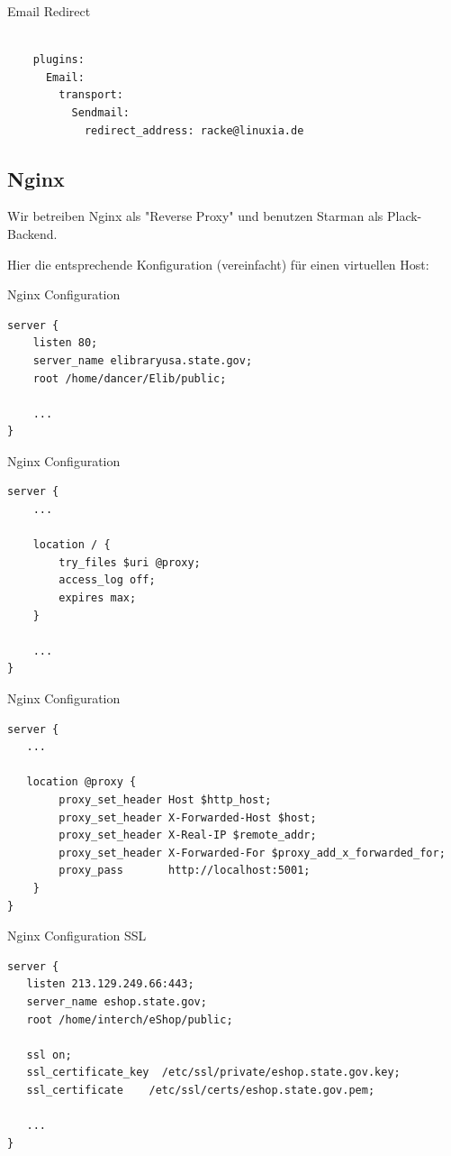 \begin{frame}[fragile]{Email Redirect}
\begin{lstlisting}

    plugins:
      Email:
        transport:
          Sendmail:
            redirect_address: racke@linuxia.de

\end{lstlisting}
\end{frame}

\subsection{Nginx}
    
Wir betreiben Nginx als "Reverse Proxy" und benutzen Starman als
Plack-Backend.

Hier die entsprechende Konfiguration (vereinfacht) für einen virtuellen
Host:

\begin{frame}[fragile]{Nginx Configuration}
\begin{lstlisting}
server {
    listen 80;
    server_name elibraryusa.state.gov;
    root /home/dancer/Elib/public;

    ...
}
\end{lstlisting}
\end{frame}

\begin{frame}[fragile]{Nginx Configuration}
\begin{lstlisting}
server {
    ...

    location / {
        try_files $uri @proxy;
        access_log off;
        expires max;
    }

    ...
}
\end{lstlisting}
\end{frame}

\begin{frame}[fragile]{Nginx Configuration}
\begin{lstlisting}
server {
   ...

   location @proxy {
        proxy_set_header Host $http_host;
        proxy_set_header X-Forwarded-Host $host;
        proxy_set_header X-Real-IP $remote_addr;
        proxy_set_header X-Forwarded-For $proxy_add_x_forwarded_for;
        proxy_pass       http://localhost:5001;
    }
}
\end{lstlisting}
\end{frame}

\begin{frame}[fragile]{Nginx Configuration SSL}
\begin{lstlisting}
server {
   listen 213.129.249.66:443;
   server_name eshop.state.gov;
   root /home/interch/eShop/public;

   ssl on;
   ssl_certificate_key  /etc/ssl/private/eshop.state.gov.key;
   ssl_certificate    /etc/ssl/certs/eshop.state.gov.pem;

   ...
}
\end{lstlisting}
\end{frame}

